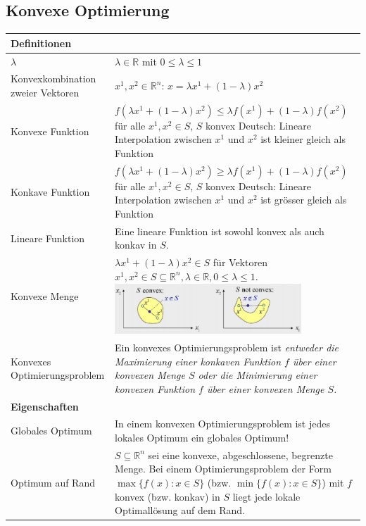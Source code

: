 \subsection{Konvexe Optimierung }
  \begin{tabularx}{\textwidth}{p{6cm} X}
  \hline
    \textbf{Definitionen} & \\
  \hline
    $\lambda$
      & $\lambda \in \mathbb{R}$ mit $0 \leq \lambda \leq 1$\\
    Konvexkombination zweier Vektoren
      & $x^1, x^2 \in \mathbb{R}^n$:  $x = \lambda x^1 + (1-\lambda) x^2$ \\
    Konvexe Funktion
      & $f(\lambda x^1 + (1-\lambda)x^2) \leq \lambda f(x^1) + (1-\lambda)f(x^2)$ für alle $x^1, x^2 \in S$, $S$ konvex \newline
      Deutsch: Lineare Interpolation zwischen $x^1$ und $x^2$ ist kleiner gleich als Funktion\\
    Konkave Funktion
      & $f(\lambda x^1 + (1-\lambda)x^2) \geq \lambda f(x^1) + (1-\lambda)f(x^2)$ für alle $x^1, x^2 \in S$, $S$ konvex \newline
      Deutsch: Lineare Interpolation zwischen $x^1$ und $x^2$ ist grösser gleich als Funktion\\
    Lineare Funktion
      & Eine lineare Funktion ist sowohl konvex als auch konkav in $S$.\\
    Konvexe Menge
      & $\lambda x^1 + (1-\lambda)x^2 \in S$ für Vektoren $x^1,x^2 \in S \subseteq \mathbb{R}^n, \lambda \in \mathbb{R}, 0 \leq \lambda \leq 1$.\newline
      \includegraphics[width=7cm]{./Content/OptMathModels/ConvexSet} \\
    Konvexes Optimierungsproblem
      & Ein konvexes Optimierungsproblem ist \em entweder \em die Maximierung einer konkaven Funktion $f$ über einer konvexen Menge $S$ \em oder \em die Minimierung einer konvexen Funktion $f$ über einer konvexen Menge $S$.\\
  \hline  
    \textbf{Eigenschaften} & \\
  \hline
    Globales Optimum
      & In einem konvexen Optimierungsproblem ist jedes lokales Optimum ein globales Optimum! \\
    Optimum auf Rand
      & $S \subseteq \mathbb{R}^n$ sei eine konvexe, abgeschlossene, begrenzte Menge. Bei einem Optimierungsproblem der Form $\max\{ f(x) : x \in S \}$ (bzw. $\min\{ f(x) : x \in S \}$) mit $f$ konvex (bzw. konkav) in $S$ liegt jede lokale Optimallösung auf dem Rand. \newline 

\end{tabularx}
